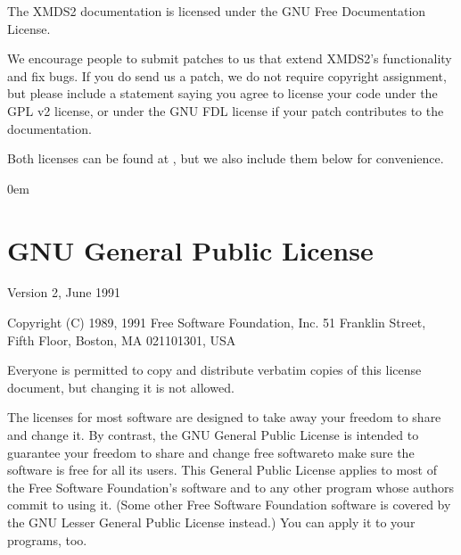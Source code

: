 \documentclass[letterpaper,10pt,english]{sphinxmanual}
\begin{document}
\sphinxAtStartPar
The XMDS2 documentation is licensed under the GNU Free Documentation License.

\sphinxAtStartPar
We encourage people to submit patches to us that extend XMDS2’s functionality and fix bugs. If you do send us a patch, we do not require copyright assignment, but please include a statement saying you agree to license your code under the GPL v2 license, or under the GNU FDL license if your patch contributes to the documentation.

\sphinxAtStartPar
Both licenses can be found at , but we also include them below for convenience.

\begin{DUlineblock}{0em}
\item[] 
\item[] 
\end{DUlineblock}

\ignorespaces 

\section{GNU General Public License}
\label{\detokenize{licensing:gnu-general-public-license}}\label{\detokenize{licensing:index-1}}
\sphinxAtStartPar
{}

\sphinxAtStartPar
Version 2, June 1991

\sphinxAtStartPar
Copyright (C) 1989, 1991 Free Software Foundation, Inc.
51 Franklin Street, Fifth Floor, Boston, MA  02110\sphinxhyphen{}1301, USA

\sphinxAtStartPar
Everyone is permitted to copy and distribute verbatim copies
of this license document, but changing it is not allowed.

\sphinxAtStartPar
{}

\sphinxAtStartPar
The licenses for most software are designed to take away your freedom to share and change it. By contrast, the GNU General Public License is intended to guarantee your freedom to share and change free software\textendash{}to make sure the software is free for all its users. This General Public License applies to most of the Free Software Foundation’s software and to any other program whose authors commit to using it. (Some other Free Software Foundation software is covered by the GNU Lesser General Public License instead.) You can apply it to your programs, too.
\end{document}
